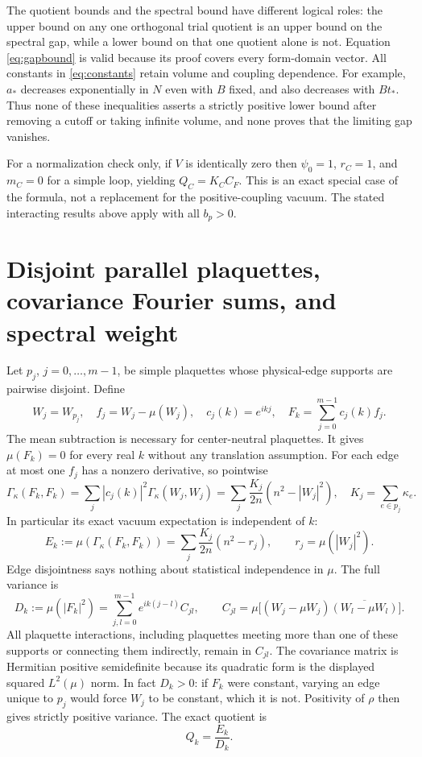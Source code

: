 \documentclass[11pt]{article}
\theoremstyle{definition}
\begin{document}
The quotient bounds and the spectral bound have different logical
roles: the upper bound on any one orthogonal trial quotient is an upper
bound on the spectral gap, while a lower bound on that one quotient
alone is not. Equation \eqref{eq:gapbound} is valid because its proof
covers every form-domain vector. All constants in
\eqref{eq:constants} retain volume and coupling dependence. For example,
$a_*$ decreases exponentially in $N$ even with $B$ fixed, and also
decreases with $Bt_*$. Thus none of these inequalities asserts a
strictly positive lower bound after removing a cutoff or taking
infinite volume, and none proves that the limiting gap vanishes.

For a normalization check only, if $V$ is identically zero then
$\psi_0=1$, $r_C=1$, and $m_C=0$ for a simple loop, yielding
$Q_C=K_CC_F$. This is an exact special case of the formula, not a
replacement for the positive-coupling vacuum. The stated interacting
results above apply with all $b_p>0$.

\section{Disjoint parallel plaquettes, covariance Fourier sums, and spectral weight}

Let $p_j$, $j=0,\ldots,m-1$, be simple plaquettes whose physical-edge
supports are pairwise disjoint. Define
\[
 W_j=W_{p_j},\quad f_j=W_j-\mu(W_j),\quad
 c_j(k)=e^{ikj},\quad F_k=\sum_{j=0}^{m-1}c_j(k)f_j.
\]
The mean subtraction is necessary for center-neutral plaquettes. It
gives $\mu(F_k)=0$ for every real $k$ without any translation assumption.
For each edge at most one $f_j$ has a nonzero derivative, so pointwise
\begin{equation}\label{eq:disjointnumerator}
 \Gamma_\kappa(F_k,F_k)
 =\sum_j|c_j(k)|^2\Gamma_\kappa(W_j,W_j)
 =\sum_j\frac{K_j}{2n}(n^2-|W_j|^2),
 \quad K_j=\sum_{e\in p_j}\kappa_e.
\end{equation}
In particular its exact vacuum expectation is independent of $k$:
\begin{equation}\label{eq:Ek}
 E_k:=\mu(\Gamma_\kappa(F_k,F_k))
      =\sum_j\frac{K_j}{2n}(n^2-r_j),\qquad r_j=\mu(|W_j|^2).
\end{equation}
Edge disjointness says nothing about statistical independence in
$\mu$. The full variance is
\begin{equation}\label{eq:Dk}
 D_k:=\mu(|F_k|^2)
 =\sum_{j,l=0}^{m-1}e^{ik(j-l)}C_{jl},\qquad
 C_{jl}=\mu\bigl[(W_j-\mu W_j)\overline{(W_l-\mu W_l)}\bigr].
\end{equation}
All plaquette interactions, including plaquettes meeting more than one
of these supports or connecting them indirectly, remain in $C_{jl}$.
The covariance matrix is Hermitian positive semidefinite because its
quadratic form is the displayed squared $L^2(\mu)$ norm.
In fact $D_k>0$: if $F_k$ were constant, varying an edge unique to $p_j$
would force $W_j$ to be constant, which it is not. Positivity of $\rho$
then gives strictly positive variance. The exact quotient is
\begin{equation}\label{eq:disjointquotient}
 Q_k=\frac{E_k}{D_k}.
\end{equation}
\end{document}
